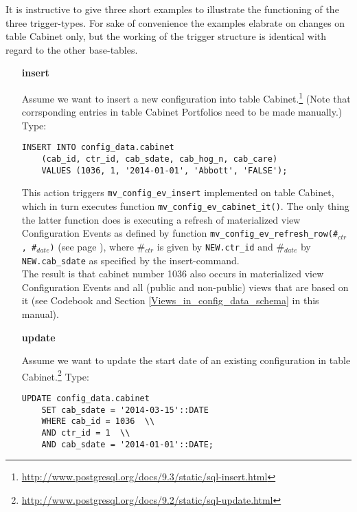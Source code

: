 It is instructive to give three short examples to illustrate the functioning of the three trigger-types. For sake of convenience the examples elabrate on changes on table Cabinet only, but the working of the trigger structure is identical with regard to the other base-tables.
\begin{itemize}
\item[{\bf insert}]{%
Assume we want to insert a new configuration into table Cabinet.\footnote{\url{http://www.postgresql.org/docs/9.3/static/sql-insert.html}}
(Note that corrsponding entries in table Cabinet Portfolios need to be made manually.) 
Type:
\begin{lstlisting}[language=postgreSQL]
INSERT INTO config_data.cabinet
	(cab_id, ctr_id, cab_sdate, cab_hog_n, cab_care)
	VALUES (1036, 1, '2014-01-01', 'Abbott', 'FALSE');
\end{lstlisting}
This action triggers \texttt{\footnotesize mv\_config\_ev\_insert} implemented on table Cabinet, which in turn executes function \texttt{\footnotesize mv\_config\_ev\_cabinet\_it()}. The only thing the latter function does is executing a refresh of materialized view Configuration Events as defined by function \texttt{\footnotesize mv\_config\_ev\_refresh\_row(\#$_{ctr}$, \#$_{date}$)} (see page \pageref{function_mv_config_ev_refresh}), where \#$_{ctr}$ is given by \texttt{\footnotesize NEW.ctr\_id} and \#$_{date}$ by \texttt{\footnotesize NEW.cab\_sdate} as specified by the insert-command.\\
The result is that cabinet number 1036 also occurs in  materialized view Configuration Events and all (public and non-public) views that are based on it (see Codebook and Section \ref{Views_in_config_data_schema} in this manual).%
}

\item[{\bf update}]{%
Assume we want to update the start date of an existing configuration in table Cabinet.\footnote{\url{http://www.postgresql.org/docs/9.2/static/sql-update.html}}
Type:
\begin{lstlisting}[language=postgreSQL]
UPDATE config_data.cabinet 
	SET cab_sdate = '2014-03-15'::DATE 
	WHERE cab_id = 1036  \\
	AND ctr_id = 1  \\
	AND cab_sdate = '2014-01-01'::DATE;
\end{lstlisting}

}
\end{itemize}
